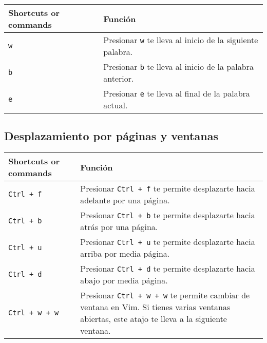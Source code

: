 \documentclass[
  doc,
  floatsintext,
  longtable,
  a4paper,
  nolmodern,
  notxfonts,
  notimes,
  colorlinks=true,linkcolor=blue,citecolor=blue,urlcolor=blue]{apa7}
\begin{document}
\begin{longtable}[]{@{}
  >{\raggedright\arraybackslash}p{}
  >{\raggedright\arraybackslash}p{}@{}}
\toprule\noalign{}
\begin{minipage}[b]{\linewidth}\raggedright
Shortcuts or commands
\end{minipage} & \begin{minipage}[b]{\linewidth}\raggedright
Función
\end{minipage} \\
\midrule\noalign{}
\endhead
\bottomrule\noalign{}
\endlastfoot
\texttt{w} & Presionar \texttt{w} te lleva al inicio de la siguiente
palabra. \\
\texttt{b} & Presionar \texttt{b} te lleva al inicio de la palabra
anterior. \\
\texttt{e} & Presionar \texttt{e} te lleva al final de la palabra
actual. \\
\end{longtable}

\subsection{Desplazamiento por páginas y
ventanas}\label{desplazamiento-por-puxe1ginas-y-ventanas}

\begin{longtable}[]{@{}
  >{\raggedright\arraybackslash}p{}
  >{\raggedright\arraybackslash}p{}@{}}
\toprule\noalign{}
\begin{minipage}[b]{\linewidth}\raggedright
Shortcuts or commands
\end{minipage} & \begin{minipage}[b]{\linewidth}\raggedright
Función
\end{minipage} \\
\midrule\noalign{}
\endhead
\bottomrule\noalign{}
\endlastfoot
\texttt{Ctrl\ +\ f} & Presionar \texttt{Ctrl\ +\ f} te permite
desplazarte hacia adelante por una página. \\
\texttt{Ctrl\ +\ b} & Presionar \texttt{Ctrl\ +\ b} te permite
desplazarte hacia atrás por una página. \\
\texttt{Ctrl\ +\ u} & Presionar \texttt{Ctrl\ +\ u} te permite
desplazarte hacia arriba por media página. \\
\texttt{Ctrl\ +\ d} & Presionar \texttt{Ctrl\ +\ d} te permite
desplazarte hacia abajo por media página. \\
\texttt{Ctrl\ +\ w\ +\ w} & Presionar \texttt{Ctrl\ +\ w\ +\ w} te
permite cambiar de ventana en Vim. Si tienes varias ventanas abiertas,
este atajo te lleva a la siguiente ventana. \\
\end{longtable}
\end{document}
